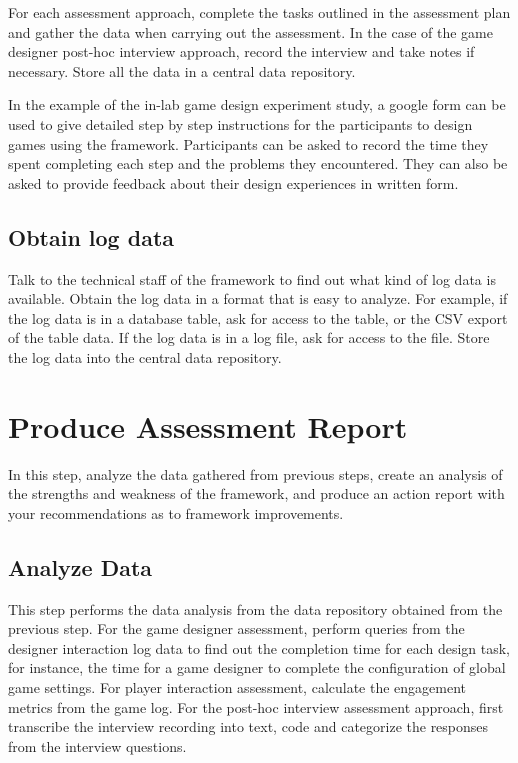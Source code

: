 For each assessment approach, complete the tasks outlined in the assessment plan and gather the data when carrying out the 
assessment. In the case of the game designer post-hoc interview approach, record the interview and take notes if necessary. 
Store all the data in a central data repository. 

In the example of the in-lab game design experiment study, a google form can be used  to give detailed step by step 
instructions for the participants to design games using the framework. Participants can be asked to record the time they spent completing 
each step and the problems they encountered. They can also be asked to provide feedback about their design experiences
in written form. 

\subsection{Obtain log data}

Talk to the technical staff of the framework to find out what kind of log data is available. Obtain the log data in a format that 
is easy to analyze. For example, if the log data is in a database table, ask for access to the table, or the CSV export of 
the table data. If the log data is in a log file, ask for access to the file. Store the log data into the central data repository.

\section{Produce Assessment Report}

In this step, analyze the data gathered from previous steps,
create an analysis of the strengths and weakness of the framework, 
and produce an action report with your recommendations as to framework improvements.

\subsection{Analyze Data}

This step performs the data analysis from the data repository obtained from the previous step. For the game designer assessment, 
perform queries from the designer interaction log data to find out the completion time for each design task, for instance, the 
time for a game designer to complete the configuration of global game settings. For player interaction assessment, calculate the 
engagement metrics from the game log. For the post-hoc interview assessment approach, first transcribe the interview recording into 
text, code and categorize the responses from the interview questions. 

